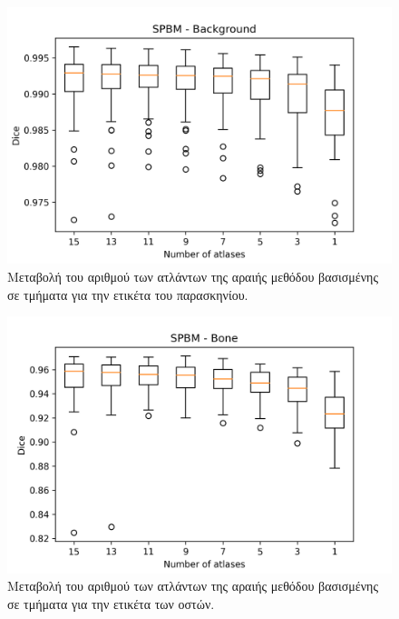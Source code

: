 \documentclass[a4paper,12pt]{article}
\begin{document}
\begin{figure}[H]
    \centering
    \includegraphics[width=0.85\linewidth]{SPBM_Number_of_atlases_Background_plot.png}
    \caption{Μεταβολή του αριθμού των ατλάντων της αραιής μεθόδου βασισμένης σε
             τμήματα για την ετικέτα του παρασκηνίου.}
    \label{fig:SPBM:atlases:1}
\end{figure}

\begin{figure}[H]
    \centering
    \includegraphics[width=0.85\linewidth]{SPBM_Number_of_atlases_Bone_plot.png}
    \caption{Μεταβολή του αριθμού των ατλάντων της αραιής μεθόδου βασισμένης σε
             τμήματα για την ετικέτα των οστών.}
    \label{fig:SPBM:atlases:2}
\end{figure}
\end{document}
